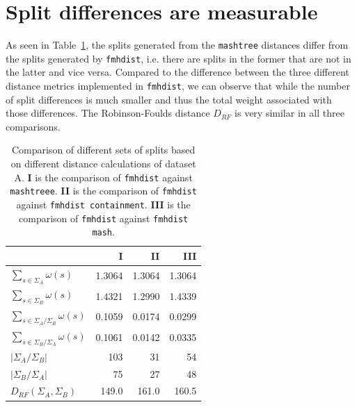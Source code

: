 \section{Split differences are measurable}
As seen in Table~\ref{ta:splitDifferences}, the splits generated from the
\texttt{mashtree} distances differ from the splits generated by
\texttt{fmhdist}, i.e. there are splits in the former that are not in the latter
and vice versa. Compared to the difference between the three different distance
metrics implemented in \texttt{fmhdist}, we can observe that while the number of
split differences is much smaller and thus the total weight associated with
those differences. The Robinson-Foulds distance $D_{RF}$ is very similar in all
three comparisons.

\begin{table}[]
  \centering
  \begin{tabular}{@{}lrrr@{}}
    \toprule
    &  \textbf{I} & \textbf{II} & \textbf{III} \\
    \midrule
  $\sum_{s \in \Sigma_A}{\omega(s)}$           & 1.3064                     & 1.3064                              & 1.3064                         \\
  $\sum_{s \in \Sigma_B}{\omega(s)}$           & 1.4321                     & 1.2990                              & 1.4339                         \\
  $\sum_{s \in \Sigma_A / \Sigma_B}{\omega(s)}$ & 0.1059                    & 0.0174                              & 0.0299                      \\
  $\sum_{s \in \Sigma_B / \Sigma_A}{\omega(s)}$ & 0.1061                    & 0.0142                             & 0.0335                       \\
  $|\Sigma_A / \Sigma_B|$                       & 103                       & 31                                 & 54                                        \\
  $|\Sigma_B / \Sigma_A|$                       & 75                        & 27                                 & 48                                        \\
  $D_{RF}(\Sigma_A, \Sigma_B)$                 & 149.0                       & 161.0                                & 160.5         \\
  \bottomrule                           
  \end{tabular}
  \caption{Comparison of different sets of splits based on different distance
  calculations of dataset A. \textbf{I} is the comparison of \texttt{fmhdist}
  against \texttt{mashtreee}. \textbf{II} is the comparison of \texttt{fmhdist}
  against \texttt{fmhdist containment}. \textbf{III} is the comparison of
  \texttt{fmhdist} against \texttt{fmhdist mash}.}
  \label{ta:splitDifferences}
\end{table}


